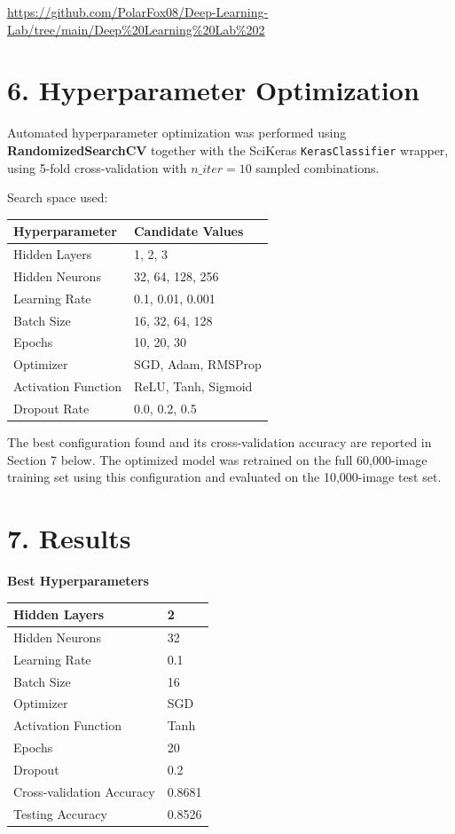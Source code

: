 \documentclass[11pt]{article}
\begin{document}
\begin{center}
\url{https://github.com/PolarFox08/Deep-Learning-Lab/tree/main/Deep%20Learning%20Lab%202}
\end{center}


\section*{6. Hyperparameter Optimization}

Automated hyperparameter optimization was performed using \textbf{RandomizedSearchCV} together with the SciKeras \texttt{KerasClassifier} wrapper, using 5-fold cross-validation with $n\_iter=10$ sampled combinations.

Search space used:

\begin{center}
\begin{tabular}{|p{5cm}|p{7cm}|}
\hline
Hyperparameter & Candidate Values\\
\hline
Hidden Layers & 1, 2, 3\\
Hidden Neurons & 32, 64, 128, 256\\
Learning Rate & 0.1, 0.01, 0.001\\
Batch Size & 16, 32, 64, 128\\
Epochs & 10, 20, 30\\
Optimizer & SGD, Adam, RMSProp\\
Activation Function & ReLU, Tanh, Sigmoid\\
Dropout Rate & 0.0, 0.2, 0.5\\
\hline
\end{tabular}
\end{center}

The best configuration found and its cross-validation accuracy are reported in Section 7 below. The optimized model was retrained on the full 60,000-image training set using this configuration and evaluated on the 10,000-image test set.

\section*{7. Results}

\textbf{Best Hyperparameters}

\begin{center}
\begin{tabular}{|p{6cm}|p{6cm}|}
\hline
Hidden Layers & 2\\\hline
Hidden Neurons & 32\\\hline
Learning Rate & 0.1\\\hline
Batch Size & 16\\\hline
Optimizer & SGD\\\hline
Activation Function & Tanh\\\hline
Epochs & 20\\\hline
Dropout & 0.2\\\hline
Cross-validation Accuracy & 0.8681\\\hline
Testing Accuracy & 0.8526\\\hline
\end{tabular}
\end{center}
\end{document}
